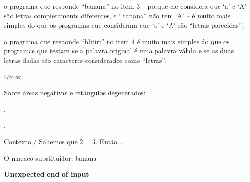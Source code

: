 \documentclass[oneside,12pt]{article}
\begin{document}
{{  \ssk

  o programa que responde ``banana'' no item 3 -- porque ele considera
  que `a' e `A' são letras completamente diferentes, e ``banana'' não
  tem `A' -- é muito mais simples do que os programas que consideram
  que `a' e `A' são ``letras parecidas'';

  \ssk

  o programa que responde ``blitiri'' no item 4 é muito mais simples
  do que os programas que testam se a palavra original é uma palavra
  válida e se as duas letras dadas são caracteres considerados como
  ``letras''.

  \bsk
  \bsk
  \bsk
  \bsk
  \bsk
  \bsk

  Links:

  Sobre áreas negativas e retângulos degenerados:

  , 

  , 
  
  \ssk

   Contexto / Sabemos que $2=3$. Então...

   O macaco substituidor: banana

}}



\newpage


{\bf Unexpected end of input}
\end{document}
